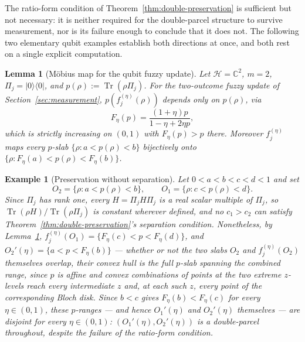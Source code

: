 \documentclass[11pt, onecolumn]{article}
\newtheorem{lemma}{Lemma}
\newtheorem{example}{Example}
\begin{document}
The ratio-form condition of Theorem~\ref{thm:double-preservation} is sufficient but not necessary: it is neither required for the double-parcel structure to survive measurement, nor is its failure enough to conclude that it does not. The following two elementary qubit examples establish both directions at once, and both rest on a single explicit computation.

\begin{lemma}[M\"obius map for the qubit fuzzy update]
\label{lem:mobius}
Let $\mathcal H=\mathbb C^2$, $m=2$, $\Pi_j=|0\rangle\langle0|$, and $p(\rho):=\operatorname{Tr}(\rho\Pi_j)$. For the two-outcome fuzzy update of Section~\ref{sec:measurement}, $p(f_j^{(\eta)}(\rho))$ depends only on $p(\rho)$, via
\[
F_\eta(p)=\frac{(1+\eta)p}{1-\eta+2\eta p},
\]
which is strictly increasing on $(0,1)$ with $F_\eta(p)>p$ there. Moreover $f_j^{(\eta)}$ maps every $p$-slab $\{\rho: a<p(\rho)<b\}$ bijectively onto $\{\rho: F_\eta(a)<p(\rho)<F_\eta(b)\}$.
\end{lemma}

\begin{example}[Preservation without separation]
\label{ex:preserved-no-separation}
Let $0<a<b<c<d<1$ and set
\[
O_2=\{\rho: a<p(\rho)<b\},\qquad O_1=\{\rho: c<p(\rho)<d\}.
\]
Since $\Pi_j$ has rank one, every $H=\Pi_jH\Pi_j$ is a real scalar multiple of $\Pi_j$, so $\operatorname{Tr}(\rho H)/\operatorname{Tr}(\rho\Pi_j)$ is constant wherever defined, and no $c_1>c_2$ can satisfy Theorem~\ref{thm:double-preservation}'s separation condition. Nonetheless, by Lemma~\ref{lem:mobius}, $f_j^{(\eta)}(O_1)=\{F_\eta(c)<p<F_\eta(d)\}$, and $O_2'(\eta)=\{a<p<F_\eta(b)\}$ — whether or not the two slabs $O_2$ and $f_j^{(\eta)}(O_2)$ themselves overlap, their convex hull is the full $p$-slab spanning the combined range, since $p$ is affine and convex combinations of points at the two extreme $z$-levels reach every intermediate $z$ and, at each such $z$, every point of the corresponding Bloch disk. Since $b<c$ gives $F_\eta(b)<F_\eta(c)$ for every $\eta\in(0,1)$, these $p$-ranges — and hence $O_1'(\eta)$ and $O_2'(\eta)$ themselves — are disjoint for \emph{every} $\eta\in(0,1)$: $(O_1'(\eta),O_2'(\eta))$ is a double-parcel throughout, despite the failure of the ratio-form condition.
\end{example}
\end{document}
